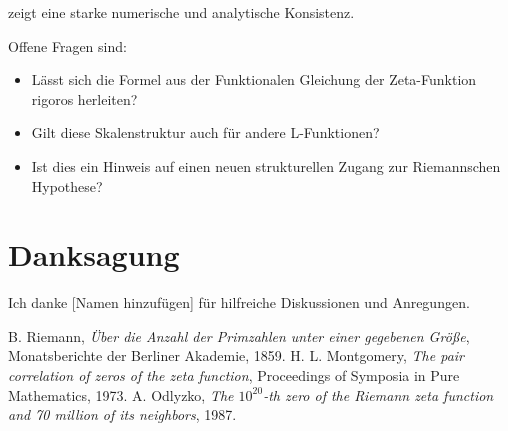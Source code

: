 \documentclass[12pt]{article}
\begin{document}
zeigt eine starke numerische und analytische Konsistenz. 

Offene Fragen sind:
\begin{itemize}
    \item Lässt sich die Formel aus der Funktionalen Gleichung der Zeta-Funktion rigoros herleiten?
    \item Gilt diese Skalenstruktur auch für andere L-Funktionen?
    \item Ist dies ein Hinweis auf einen neuen strukturellen Zugang zur Riemannschen Hypothese?
\end{itemize}

\section*{Danksagung}
Ich danke [Namen hinzufügen] für hilfreiche Diskussionen und Anregungen.

\begin{thebibliography}{9}
 B. Riemann, \textit{Über die Anzahl der Primzahlen unter einer gegebenen Größe}, Monatsberichte der Berliner Akademie, 1859.
 H. L. Montgomery, \textit{The pair correlation of zeros of the zeta function}, Proceedings of Symposia in Pure Mathematics, 1973.
 A. Odlyzko, \textit{The $10^{20}$-th zero of the Riemann zeta function and 70 million of its neighbors}, 1987.
\end{thebibliography}
\end{document}
